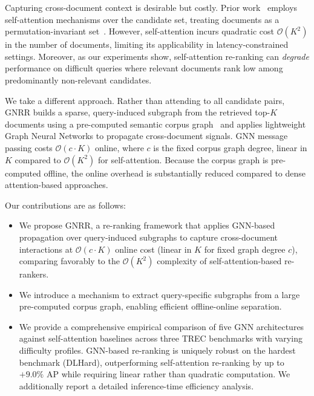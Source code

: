\documentclass[runningheads]{llncs}
\newcommand{\ModelName}{GNRR\xspace}
\begin{document}
Capturing cross-document context is desirable but costly. Prior work~\cite{pang2020setrank,pobrotyn2020context,pasumarthi2020permutation} employs self-attention mechanisms over the candidate set, treating documents as a permutation-invariant set~\cite{lee2019set,pang2020setrank}. However, self-attention incurs quadratic cost $\mathcal{O}(K^2)$ in the number of documents, limiting its applicability in latency-constrained settings.
Moreover, as our experiments show, self-attention re-ranking can \emph{degrade} performance on difficult queries where relevant documents rank low among predominantly non-relevant candidates.

We take a different approach. Rather than attending to all candidate pairs, \ModelName builds a sparse, query-induced subgraph from the retrieved top-$K$ documents using a pre-computed semantic corpus graph~\cite{corpusgraph} and applies lightweight Graph Neural Networks to propagate cross-document signals. GNN message passing costs $\mathcal{O}(c \cdot K)$ online, where $c$ is the fixed corpus graph degree, linear in $K$ compared to $\mathcal{O}(K^2)$ for self-attention. Because the corpus graph is pre-computed offline, the online overhead is substantially reduced compared to dense attention-based approaches.

Our contributions are as follows:
\begin{itemize}
    \item We propose \ModelName, a re-ranking framework that applies GNN-based propagation over query-induced subgraphs to capture cross-document interactions at $\mathcal{O}(c \cdot K)$ online cost (linear in $K$ for fixed graph degree $c$), comparing favorably to the $\mathcal{O}(K^2)$ complexity of self-attention-based re-rankers.
    \item We introduce a mechanism to extract query-specific subgraphs from a large pre-computed corpus graph, enabling efficient offline-online separation.
    \item We provide a comprehensive empirical comparison of five GNN architectures against self-attention baselines across three TREC benchmarks with varying difficulty profiles. GNN-based re-ranking is uniquely robust on the hardest benchmark (DLHard), outperforming self-attention re-ranking by up to $+9.0\%$ AP while requiring linear rather than quadratic computation. We additionally report a detailed inference-time efficiency analysis.
\end{itemize}
\end{document}
